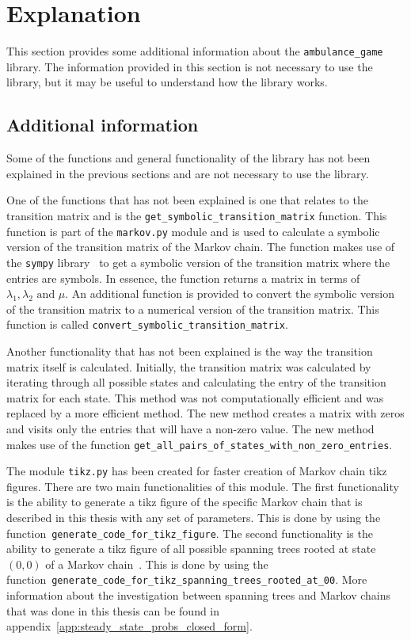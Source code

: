\section{Explanation}\label{sec:ambulance_game_explanation}

This section provides some additional information about the
\texttt{ambulance\_game} library.
The information provided in this section is not necessary to use the library,
but it may be useful to understand how the library works.

\subsection{Additional information}

Some of the functions and general functionality of the library has not been
explained in the previous sections and are not necessary to use the library.

One of the functions that has not been explained is one that relates to the
transition matrix and is the \texttt{get\_symbolic\_transition\_matrix}
function.
This function is part of the \texttt{markov.py} module and is used to calculate
a symbolic version of the transition matrix of the Markov chain.
The function makes use of the \texttt{sympy} library~\cite{sympy} to get a
symbolic version of the transition matrix where the entries are symbols.
In essence, the function returns a matrix in terms of \(\lambda_1, \lambda_2
\text{ and } \mu\).
An additional function is provided to convert the symbolic version of the
transition matrix to a numerical version of the transition matrix.
This function is called \texttt{convert\_symbolic\_transition\_matrix}.

Another functionality that has not been explained is the way the transition
matrix itself is calculated.
Initially, the transition matrix was calculated by iterating through all
possible states and calculating the entry of the transition matrix for each
state.
This method was not computationally efficient and was replaced by a more
efficient method.
The new method creates a matrix with zeros and visits only the entries that
will have a non-zero value.
The new method makes use of the function
\texttt{get\_all\_pairs\_of\_states\_with\_non\_zero\_entries}.

The module \texttt{tikz.py} has been created for faster creation of
Markov chain tikz figures.
There are two main functionalities of this module.
The first functionality is the ability to generate a tikz figure of the
specific Markov chain that is described in this thesis with any set of
parameters.
This is done by using the function~\texttt{generate\_code\_for\_tikz\_figure}.
The second functionality is the ability to generate a tikz figure of all
possible spanning trees rooted at state \((0, 0)\) of a Markov
chain~\cite{sung2016enumeration, levine2011sandpile}.
This is done by using the
function~\texttt{generate\_code\_for\_tikz\_spanning\_trees\_rooted\_at\_00}.
More information about the investigation between spanning trees and Markov
chains that was done in this thesis can be found in
appendix~\ref{app:steady_state_probs_closed_form}.


